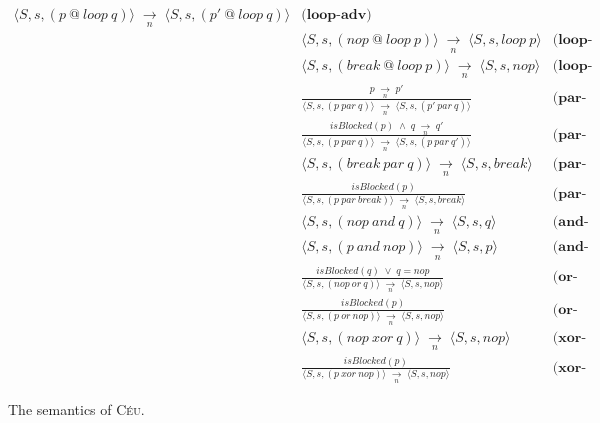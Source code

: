 \documentclass{acm_proc_article-sp}
\newcommand{\CEU}{\textsc{C\'{e}u}\xspace}
\newcommand{\ST}{\1\xrightarrow[~n~]{}\1}
\newcommand{\LL}{\langle}
\newcommand{\RR}{\rangle}
\newcommand{\DS}{\displaystyle}
\newcommand{\1}{\;}
\newcommand{\2}{\;\;}
\newcommand{\3}{\;\;\;}
\newcommand{\5}{\;\;\;\;\;}
\begin{document}
\begin{figure}
{\begin{eqnarray*}
    {\DS \LL S,s, (p~@~loop~q) \RR \ST \LL S,s, (p'~@~loop~q) \RR }
    & \textbf{(loop-adv)}    \\
& \LL S,s, (nop~@~loop~p) \RR \ST \LL S,s, loop~p \RR
    & \textbf{(loop-nop)}    \\
& \LL S,s, (break~@~loop~p) \RR \ST \LL S,s, nop \RR
    & \textbf{(loop-brk)}       \\
%
& \frac
    {\DS p \ST p' }
    {\DS \LL S,s, (p~par~q) \RR \ST \LL S,s, (p'~par~q) \RR }
    & \textbf{(par-adv1)}      \\
& \frac
    {\DS isBlocked(p) \1\wedge\1 q \ST q' }
    {\DS \LL S,s, (p~par~q) \RR \ST \LL S,s, (p~par~q') \RR }
    & \textbf{(par-adv2)}      \\
& \LL S,s, (break~par~q) \RR \ST \LL S,s, break \RR
    & \textbf{(par-brk1)}   \\
& \frac
    {\DS isBlocked(p) }
    {\DS \LL S,s, (p~par~break) \RR \ST \LL S,s, break \RR }
    & \textbf{(par-brk2)}       \\
& \LL S,s, (nop~and~q) \RR \ST \LL S,s, q \RR
    & \textbf{(and-nop1)}   \\
& \LL S,s, (p~and~nop) \RR \ST \LL S,s, p \RR
    & \textbf{(and-nop2)}   \\
%
%
& \frac
    {\DS isBlocked(q) \1\vee\1 q=nop}
    {\DS \LL S,s, (nop~or~q) \RR \ST \LL S,s, nop \RR }
    & \textbf{(or-nop1)}    \\
& \frac
    {\DS isBlocked(p)}
    {\DS \LL S,s, (p~or~nop) \RR \ST \LL S,s, nop \RR }
    & \textbf{(or-nop2)}    \\
& \LL S,s, (nop~xor~q) \RR \ST \LL S,s, nop \RR
    & \textbf{(xor-nop1)}   \\
& \frac
    {\DS isBlocked(p) }
    {\DS \LL S,s, (p~xor~nop) \RR \ST \LL S,s, nop \RR }
    & \textbf{(xor-nop2)}
%
\end{eqnarray*}
}
%
\caption{ The semantics of \CEU.
\label{fig.sem}
}
\end{figure}
\end{document}
